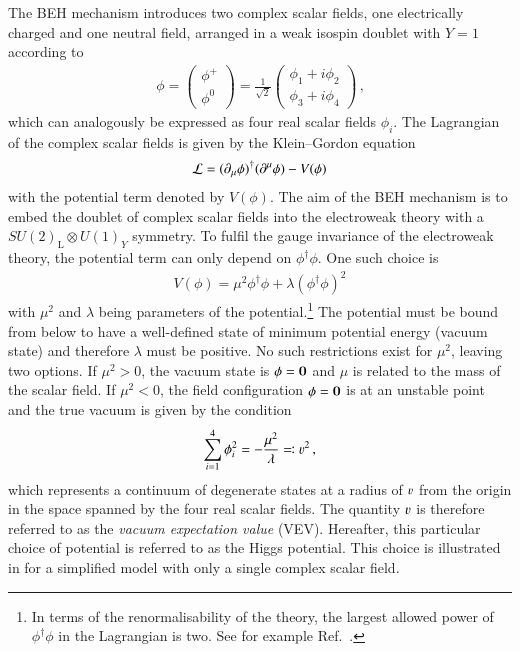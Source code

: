 The BEH mechanism introduces two complex scalar fields, one electrically charged
and one neutral field, arranged in a weak isospin doublet with $Y = 1$ according
to
\begin{align*}
  \phi =
  \begin{pmatrix}
    \phi^+ \\
    \phi^0
  \end{pmatrix}
  = \frac{1}{\sqrt{2}}
  \begin{pmatrix}
    \phi_1 + i \phi_2 \\
    \phi_3 + i \phi_4
  \end{pmatrix} \,\text{,}
\end{align*}
which can analogously be expressed as four real scalar fields $\phi_i$. The
Lagrangian of the complex scalar fields is given by the Klein--Gordon equation
\begin{align*}
  \mathcal{L} = (\partial_\mu \phi)^\dagger (\partial^\mu \phi) - V(\phi)
\end{align*}
with the potential term denoted by $V(\phi)$. The aim of the BEH mechanism is to
embed the doublet of complex scalar fields into the electroweak theory with a
$SU(2)_{\text{L}}\otimes U(1)_Y$ symmetry. To fulfil the gauge invariance of the
electroweak theory, the potential term can only depend on $\phi^\dagger
\phi$. One such choice is
\begin{align}
  V(\phi) = \mu^2 \phi^\dagger \phi + \lambda (\phi^\dagger \phi)^2
  \label{eq:higgs_potential}
\end{align}
with $\mu^2$ and $\lambda$ being parameters of the potential.\footnote{In terms
  of the renormalisability of the theory, the largest allowed power of
  $\phi^\dagger \phi$ in the Lagrangian is two. See for example
  Ref.~\cite{Peskin:1995ev}.} The potential must be bound from below to have a
well-defined state of minimum potential energy (vacuum state) and therefore
$\lambda$ must be positive. No such restrictions exist for $\mu^2$, leaving two
options. If $\mu^2 > 0$, the vacuum state is $\phi = \bm{0}$ and $\mu$ is
related to the mass of the scalar field. If $\mu^2 < 0$, the field configuration
$\phi = \bm{0}$ is at an unstable point and the true vacuum is given by the
condition
\begin{align*}
  \sum_{i = 1}^4 \phi_i^2 = -\frac{\mu^2}{\lambda} \eqqcolon \varv^2 \,\text{,}
\end{align*}
which represents a continuum of degenerate states at a radius of $\varv$ from the
origin in the space spanned by the four real scalar fields. The quantity $\varv$ is
therefore referred to as the \emph{vacuum expectation value} (VEV). Hereafter,
this particular choice of potential is referred to as the Higgs potential. This
choice is illustrated in  for a simplified model with only
a single complex scalar field.

